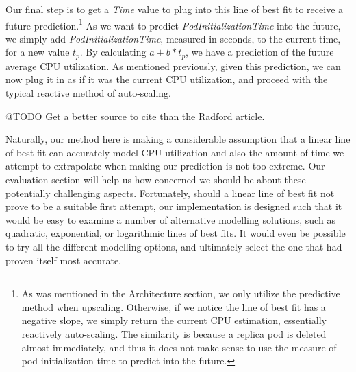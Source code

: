Our final step is to get a \textit{Time} value to plug into this line of best
fit to receive a future prediction.\footnote{As was mentioned in the
Architecture section, we only utilize the predictive method when upscaling.
Otherwise, if we notice the line of best fit has a negative slope, we simply
return the current CPU estimation, essentially reactively auto-scaling. The
similarity is because a replica pod is deleted almost immediately, and thus it
does not make sense to use the measure of pod initialization time to predict
into the future.} As we want to predict
\textit{PodInitializationTime} into the future, we simply add
\textit{PodInitializationTime}, measured in seconds, to the current time, for a
new value $t_{p}$. By calculating $a + b * t_{p}$, we have a prediction of the
future average CPU utilization. As mentioned previously, given this prediction,
we can now plug it in as if it was the current CPU utilization, and proceed with
the typical reactive method of auto-scaling.

@TODO Get a better source to cite than the Radford article.

Naturally, our method here is making a considerable assumption that a linear
line of best fit can accurately model CPU utilization and also the amount of
time we attempt to extrapolate when making our prediction is not too extreme.
Our evaluation section will help us how concerned we should be about these
potentially challenging aspects. Fortunately, should a linear line of best fit
not prove to be a suitable first attempt, our implementation is designed such
that it would be easy to examine a number of alternative modelling solutions,
such as quadratic, exponential, or logarithmic lines of best fits. It would even
be possible to try all the different modelling options, and ultimately select
the one that had proven itself most accurate.
